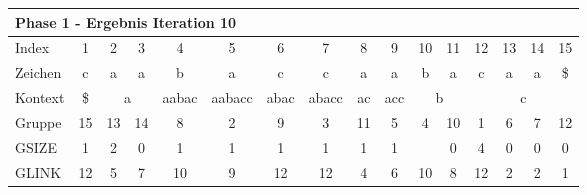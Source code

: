 \begin{table}[H]
\centering
\begin{adjustbox}{max width=\textwidth}
\begin{tabular}{lccccccccccccccc}
\multicolumn{16}{l}{Phase 1 - Ergebnis Iteration 10}                                                                                                                                                                                                                                                                                                 \\ \hline
\multicolumn{1}{l|}{Index}   & \cellcolor[HTML]{\green}1 & 2  & 3                       & 4                          & 5                           & 6                         & 7                          & 8                       & 9                        & 10 & 11                      & 12 & 13 & 14 & 15                        \\
\multicolumn{1}{l|}{Zeichen} & c                         & a  & a                       & b                          & a                           & c                         & c                          & a                       & a                        & b  & a                       & c  & a  & a  & \$                        \\ \cline{1-16}
\multicolumn{1}{l|}{Kontext} & \multicolumn{1}{c|}{\$}   & \multicolumn{2}{c|}{a}       & \multicolumn{1}{c|}{aabac} & \multicolumn{1}{c|}{aabacc} & \multicolumn{1}{c|}{abac} & \multicolumn{1}{c|}{abacc} & \multicolumn{1}{c|}{ac} & \multicolumn{1}{c|}{acc} & \multicolumn{2}{c|}{b}       & \multicolumn{4}{c}{c}                    \\
\multicolumn{1}{l|}{Gruppe}      & \multicolumn{1}{c|}{15}   & 13 & \multicolumn{1}{c|}{14} & \multicolumn{1}{c|}{8}     & \multicolumn{1}{c|}{2}      & \multicolumn{1}{c|}{9}    & \multicolumn{1}{c|}{3}     & \multicolumn{1}{c|}{11} & \multicolumn{1}{c|}{5}   & 4  & \multicolumn{1}{c|}{10} & 1  & 6  & 7  & 12                        \\
\multicolumn{1}{l|}{GSIZE}   & \multicolumn{1}{c|}{1}    & 2  & \multicolumn{1}{c|}{0}  & \multicolumn{1}{c|}{1}     & \multicolumn{1}{c|}{1}      & \multicolumn{1}{c|}{1}    & \multicolumn{1}{c|}{1}     & \multicolumn{1}{c|}{1}  & \multicolumn{1}{c|}{1}   &    & \multicolumn{1}{c|}{0}  & 4  & 0  & 0  & 0                         \\
\multicolumn{1}{l|}{GLINK}   & 12                        & 5  & 7                       & 10                         & 9                           & 12                        & 12                         & 4                       & 6                        & 10 & 8                       & 12 & 2  & 2  & 1                         \\

\end{tabular}
\end{adjustbox}
\end{table}
